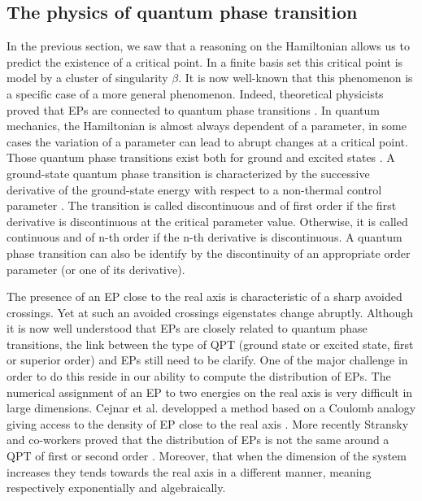 \documentclass[11pt,a4paper]{article}
\begin{document}
{\subsection{The physics of quantum phase transition}

In the previous section, we saw that a reasoning on the Hamiltonian allows us to predict the existence of a critical point. In a finite basis set this critical point is model by a cluster of singularity $\beta$. It is now well-known that this phenomenon is a specific case of a more general phenomenon. Indeed, theoretical physicists proved that EPs are connected to quantum phase transitions \cite{Heiss_1988, Heiss_2002, Cejnar_2005, Cejnar_2007, Cejnar_2009, Borisov_2015, Sindelka_2017}. In quantum mechanics, the Hamiltonian is almost always dependent of a parameter, in some cases the variation of a parameter can lead to abrupt changes at a critical point. Those quantum phase transitions exist both for ground and excited states \cite{Cejnar_2009, Sachdev_2011, Cejnar_2015, Cejnar_2016, Caprio_2008, Macek_2019}. A ground-state quantum phase transition is characterized by the successive derivative of the ground-state energy with respect to a non-thermal control parameter \cite{Cejnar_2009, Sachdev_2011}. The transition is called discontinuous and of first order if the first derivative is discontinuous at the critical parameter value. Otherwise, it is called continuous and of n-th order if the n-th derivative is discontinuous. A quantum phase transition can also be identify by the discontinuity of an appropriate order parameter (or one of its derivative). 

The presence of an EP close to the real axis is characteristic of a sharp avoided crossings. Yet at such an avoided crossings eigenstates change abruptly. Although it is now well understood that EPs are closely related to quantum phase transitions, the link between the type of QPT (ground state or excited state, first or superior order) and EPs still need to be clarify. One of the major challenge in order to do this reside in our ability to compute the distribution of EPs. The numerical assignment of an EP to two energies on the real axis is very difficult in large dimensions. Cejnar et al. developped a method based on a Coulomb analogy giving access to the density of EP close to the real axis \cite{Cejnar_2005, Cejnar_2007}. More recently Stransky and co-workers proved that the distribution of EPs is not the same around a QPT of first or second order \cite{Stransky_2018}. Moreover, that when the dimension of the system increases they tends towards the real axis in a different manner, meaning respectively exponentially and algebraically.

}
\end{document}

